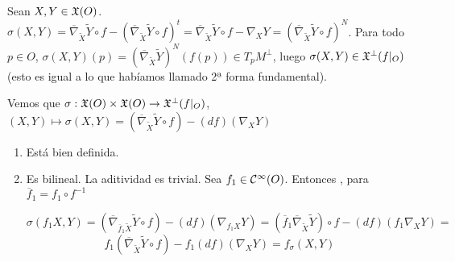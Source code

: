 \documentclass[GSR.tex]{subfiles}
\begin{document}
\begin{defi}
Sean $X,Y\in{\mathfrak{X}}(O)$. $\sigma(X,Y)=\overline{\nabla}_{\widetilde{X}}\widetilde{Y}\circ f-(\overline{\nabla}_{\widetilde{X}}\widetilde{Y}\circ f)^t=\overline{\nabla}_{\widetilde{X}}\widetilde{Y}\circ f-\nabla_XY=(\overline{\nabla}_{\widetilde{X}}\widetilde{Y}\circ f)^N$. Para todo $p\in O$, $\sigma(X,Y)(p)=(\overline{\nabla}_{\widetilde{X}}\widetilde{Y})^N(f(p))\in T_pM^\perp$, luego $\sigma(X,Y)\in{\mathfrak{X}}^\perp(f|_O)$ (esto es igual a lo que habíamos llamado 2ª forma fundamental). 

Vemos que $\sigma:{\mathfrak{X}}(O)\times{\mathfrak{X}}(O)\to{\mathfrak{X}}^\perp(f|_O)$, $(X,Y)\mapsto\sigma(X,Y)=(\overline{\nabla}_{\widetilde{X}}\widetilde{Y}\circ f)-(df)(\nabla_X Y)$ 
\begin{enumerate}
\item Está bien definida.
\item Es bilineal. La aditividad es trivial. Sea $f_1\in\mathcal{C}^{\infty}(O)$. Entonces , para $\overline{f}_1=f_1\circ f^{-1}$

$$
\sigma(f_1X,Y)=(\overline{\nabla}_{\overline{f}_1\widetilde{X}}\widetilde{Y}\circ f)-(df)(\nabla_{f_1X}Y)=(\overline{f}_1\overline{\nabla}_{\widetilde{X}}\widetilde{Y})\circ f-(df)(f_1\nabla_XY)=
$$
$$f_1(\overline{\nabla}_{\widetilde{X}}\widetilde{Y}\circ f)-f_1(df)(\nabla_XY)=f_\sigma(X,Y)$$


\end{enumerate}
\end{defi}
\end{document}
